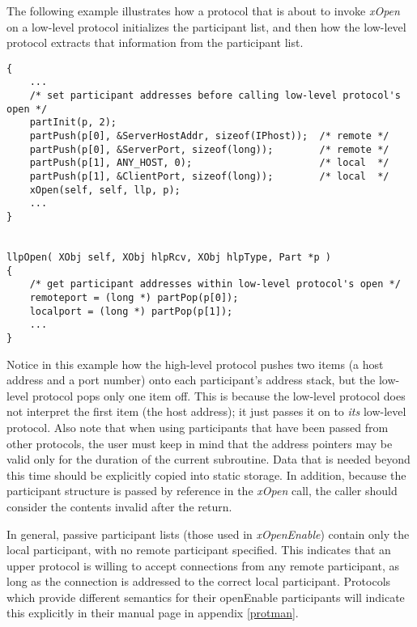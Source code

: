 The following example illustrates how a protocol that is about to invoke
{\em xOpen} on a low-level protocol initializes the participant list, and 
then how the low-level protocol extracts that information from the
participant list.

\begin{verbatim}
{
    ...
    /* set participant addresses before calling low-level protocol's open */
    partInit(p, 2);
    partPush(p[0], &ServerHostAddr, sizeof(IPhost));  /* remote */
    partPush(p[0], &ServerPort, sizeof(long));        /* remote */
    partPush(p[1], ANY_HOST, 0);                      /* local  */
    partPush(p[1], &ClientPort, sizeof(long));        /* local  */
    xOpen(self, self, llp, p);
    ...
}


llpOpen( XObj self, XObj hlpRcv, XObj hlpType, Part *p )
{
    /* get participant addresses within low-level protocol's open */
    remoteport = (long *) partPop(p[0]);
    localport = (long *) partPop(p[1]);
    ...
}
\end{verbatim}

Notice in this example how the high-level protocol pushes two 
items (a host address and a port number) onto each participant's
address stack, but the low-level protocol pops only one item off.
This is because the low-level protocol does not interpret the first
item (the host address); 
it just passes it on to {\em its} low-level protocol. Also note
that when using participants that have been passed from other
protocols, the user must keep in mind that the address pointers may be
valid only for the duration of the current subroutine.  Data that is
needed beyond this time should be explicitly copied into static
storage.  In addition, because the participant structure is passed by
reference in the {\em xOpen} call, the caller should consider the
contents invalid after the return.

In general, passive participant lists (those used in {\em
xOpenEnable}) contain only the local participant, with no remote
participant specified.  This indicates that an upper protocol is
willing to accept connections from any remote participant, as long as
the connection is addressed to the correct local participant.
Protocols which provide different semantics for their openEnable
participants will indicate this explicitly in their manual page in
appendix \ref{protman}.

